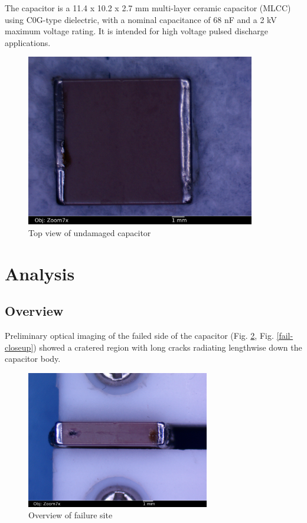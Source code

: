 \documentclass{article}
\begin{document}
The capacitor is a 11.4 x 10.2 x 2.7 mm multi-layer ceramic capacitor (MLCC) using C0G-type dielectric, with a nominal
capacitance of 68 nF and a 2 kV maximum voltage rating. It is intended for high voltage pulsed discharge applications.

\begin{figure}[h]
\includegraphics[width=10cm,keepaspectratio]{01-goodcap-top_annotated.jpg}
\caption{Top view of undamaged capacitor}
\label{overview}
\end{figure}

\pagebreak
\section{Analysis}

\subsection{Overview}

Preliminary optical imaging of the failed side of the capacitor (Fig. \ref{fail-overview}, Fig. \ref{fail-closeup})
showed a cratered region with long cracks radiating lengthwise down the capacitor body.

\begin{figure}[h]
\includegraphics[width=8cm,keepaspectratio]{02-badcap-side_annotated.jpg}
\caption{Overview of failure site}
\label{fail-overview}
\end{figure}
\end{document}
